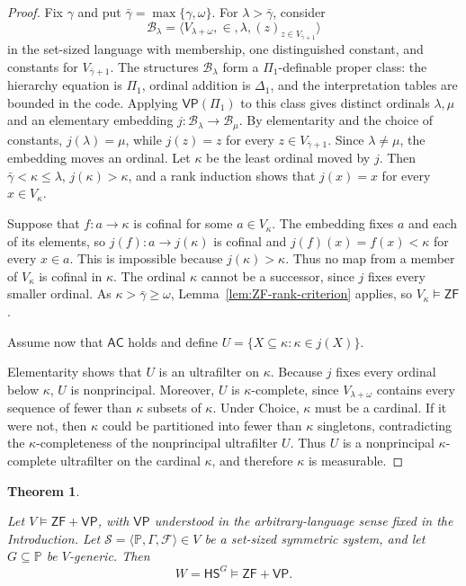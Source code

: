 \documentclass[11pt,a4paper]{amsart}
\newcommand{\VP}{\mathsf{VP}}
\newcommand{\AC}{\mathsf{AC}}
\newcommand{\ZF}{\mathsf{ZF}}
\newcommand{\HS}{\mathsf{HS}}
\theoremstyle{plain}
\newtheorem{theorem}{Theorem}[section]
\theoremstyle{definition}
\theoremstyle{remark}
\begin{document}
\begin{proof}

Fix $\gamma$ and put $\bar\gamma=\max\{\gamma,\omega\}$.  For $\lambda>\bar\gamma$, consider
\[
\mathcal B_\lambda=\bigl\langle V_{\lambda+\omega},\in,\lambda,
(z)_{z\in V_{\bar\gamma+1}}\bigr\rangle
\]
 in the set-sized language with membership, one distinguished constant, and constants for $V_{\bar\gamma+1}$.  The structures $\mathcal B_\lambda$ form a $\Pi_1$-definable proper class: the hierarchy equation is $\Pi_1$, ordinal addition is $\Delta_1$, and the interpretation tables are bounded in the code.  Applying $\VP(\Pi_1)$ to this class gives distinct ordinals $\lambda,\mu$ and an elementary embedding $j:\mathcal B_\lambda\longrightarrow\mathcal B_\mu$.
By elementarity and the choice of constants, $j(\lambda)=\mu$, while $j(z)=z$ for every $z\in V_{\bar\gamma+1}$.  Since $\lambda\ne\mu$, the embedding moves an ordinal.  Let $\kappa$ be the least ordinal moved by $j$.  Then $\bar\gamma<\kappa\leq\lambda$, $j(\kappa)>\kappa$, and a rank induction shows that $j(x)=x$ for every $x\in V_\kappa$.

 Suppose that $f:a\to\kappa$ is cofinal for some $a\in V_\kappa$.  The embedding fixes $a$ and each of its elements, so $j(f):a\to j(\kappa)$ is cofinal and $j(f)(x)=f(x)<\kappa$ for every $x\in a$.  This is impossible because $j(\kappa)>\kappa$.  Thus no map from a member of $V_\kappa$ is cofinal in $\kappa$.  The ordinal $\kappa$ cannot be a successor, since $j$ fixes every smaller ordinal.  As $\kappa>\bar\gamma\geq\omega$, Lemma~\ref{lem:ZF-rank-criterion} applies, so $V_\kappa\models\ZF$.

Assume now that $\AC$ holds and define $U=\{X\subseteq\kappa:\kappa\in j(X)\}$.

Elementarity shows that $U$ is an ultrafilter on $\kappa$.  Because $j$ fixes every ordinal below $\kappa$, $U$ is nonprincipal.  Moreover, $U$ is $\kappa$-complete, since $V_{\lambda+\omega}$ contains every sequence of fewer than $\kappa$ subsets of $\kappa$.  Under Choice, $\kappa$ must be a cardinal.  If it were not, then $\kappa$ could be partitioned into fewer than $\kappa$ singletons, contradicting the $\kappa$-completeness of the nonprincipal ultrafilter $U$.  Thus $U$ is a nonprincipal $\kappa$-complete ultrafilter on the cardinal $\kappa$, and therefore $\kappa$ is measurable.
\end{proof}

\begin{theorem}\label{thm:preservation}

Let $V\models\ZF+\VP$, with $\VP$ understood in the arbitrary-language sense fixed in the Introduction.  Let $\mathscr S=\langle\mathbb P,\Gamma,\mathcal F\rangle\in V$ be a set-sized symmetric system, and let $G\subseteq\mathbb P$ be $V$-generic.  Then
\[
W=\HS^G\models\ZF+\VP.
\]
\end{theorem}
\end{document}
